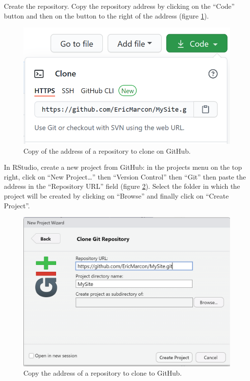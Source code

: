 \documentclass[
  12pt,
  american,
  a4paper,
  extrafontsizes,onecolumn,openright
  ]{memoir}
\begin{document}
Create the repository.
Copy the repository address by clicking on the \enquote{Code} button and then on the button to the right of the address (figure \ref{fig:rediger-GitHub-Clone}).



\scriptsize

\begin{figure}

{\centering \includegraphics[width=0.8\linewidth]{images/rediger-GitHub-Clone} 

}

\caption{Copy of the address of a repository to clone on GitHub.}\label{fig:rediger-GitHub-Clone}
\end{figure}

\normalsize

In RStudio, create a new project from GitHub: in the projects menu on the top right, click on \enquote{New Project\ldots{}} then \enquote{Version Control} then \enquote{Git} then paste the address in the \enquote{Repository URL} field (figure \ref{fig:rediger-Projet-GitHub}).
Select the folder in which the project will be created by clicking on \enquote{Browse} and finally click on \enquote{Create Project}.



\scriptsize

\begin{figure}

{\centering \includegraphics[width=0.8\linewidth]{images/rediger-Projet-GitHub} 

}

\caption{Copy the address of a repository to clone to GitHub.}\label{fig:rediger-Projet-GitHub}
\end{figure}
\end{document}
